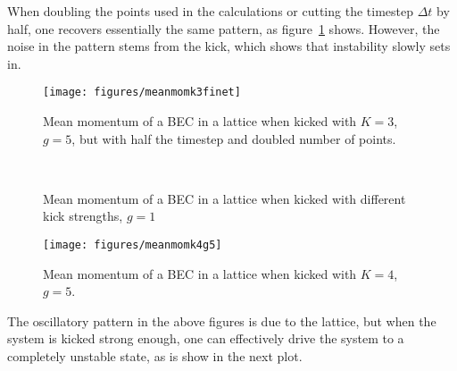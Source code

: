 When doubling the points used in the calculations or cutting the timestep $\Delta t$ by half, one recovers essentially the same pattern, as figure~\ref{fig:meanmomk3finet} shows. However, the noise in the pattern stems from the kick, which shows that instability slowly sets in.

\begin{figure}[H]
\begin{center}
\texttt{[image: figures/meanmomk3finet]}
\caption{Mean momentum of a BEC in a lattice when kicked with $K=3$, $g=5$, but with half the timestep and doubled number of points.}
\label{fig:meanmomk3finet}
\end{center}
\end{figure}

\begin{figure}[H]
	\centering
	\mbox{
		}
	\caption{Mean momentum of a BEC in a lattice when kicked with different kick strengths, $g=1$}\label{fig:meanmomk4/5g1}
\end{figure}



\begin{figure}[H]
\begin{center}
\texttt{[image: figures/meanmomk4g5]}
\caption{Mean momentum of a BEC in a lattice when kicked with $K=4$, $g=5$.}
\label{fig:meanmomk4g5}
\end{center}
\end{figure}



The oscillatory pattern in the above figures is due to the lattice, but when the system is kicked strong enough, one can effectively drive the system to a completely unstable state, as is show in the next plot.

